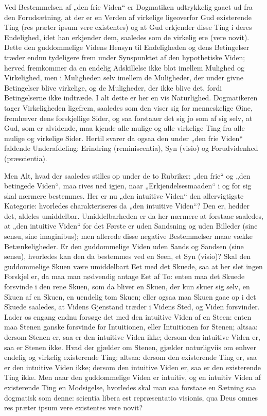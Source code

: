 \documentclass[12pt]{book}
\newcommand{\opage}[1]{\marginnote{\footnotesize\textit{[#1]}}}
\begin{document}
Ved Bestemmelsen af „den frie Viden“ er Dogmatiken udtrykkelig gaaet ud fra den Forudsætning, at
der er en Verden af virkelige ligeoverfor Gud existerende Ting (res præter ipsum vere existentes)
og at Gud erkjender disse Ting i deres Endelighed, idet han erkjender dem, saaledes som de virkelig
ere (vere novit). Dette den guddommelige Videns Hensyn til Endeligheden og dens Betingelser træder
endnu tydeligere frem under Synspunktet af den hypothetiske Viden; herved fremkommer da en endelig
Adskillelse ikke blot imellem Mulighed og Virkelighed, men i Muligheden selv imellem de Muligheder,
der under givne Betingelser blive virkelige, og de Muligheder, der ikke blive det, fordi
Betingelserne ikke indtræde. I alt dette er her en vis Naturlighed. Dogmatikeren tager
Virkeligheden ligefrem, saaledes som den viser sig for menneskelige Øine, fremhæver dens
forskjellige Sider, og saa forstaaer det sig jo som af sig selv, at Gud, som er alvidende, maa
kjende alle mulige og alle virkelige Ting fra alle mulige og virkelige Sider. Hertil svarer da
ogsaa den under „den frie Viden“ faldende Underafdeling: Erindring (reminiscentia), Syn (visio) og
Forudvidenhed (præscientia).

\opage{237} Men Alt, hvad der saaledes stilles op under de to Rubriker: „den frie“ og „den betingede Viden“,
maa rives ned igjen, naar „Erkjendelsesmaaden“ i og for sig skal nærmere bestemmes. Her er nu „den
intuitive Viden“ den allervigtigste Kategorie: hvorledes charakteriseres da „den intuitive Viden“?
Den er, hedder det, aldeles umiddelbar. Umiddelbarheden er da her nærmere at forstaae saaledes, at
„den intuitive Viden“ for det Første er uden Sandsning og uden Billeder (sine sensu, sine
imaginibus); men allerede disse negative Bestemmelser maae vække Betænkeligheder. Er den
guddommelige Viden uden Sands og Sandsen (sine sensu), hvorledes kan den da bestemmes ved en Seen,
et Syn (visio)? Skal den guddommelige Skuen være umiddelbart Eet med det Skuede, saa at her slet
ingen Forskjel er, da maa man nødvendig antage Eet af To: enten maa det Skuede forsvinde i den rene
Skuen, som da bliver en Skuen, der kun skuer sig selv, en Skuen af en Skuen, en uendelig tom Skuen;
eller ogsaa maa Skuen gaae op i det Skuede saaledes, at Videns Gjenstand træder i Videns Sted, og
Viden forsvinder. Lader os engang endnu forsøge det med den intuitive Viden af en Steen: enten maa
Stenen ganske forsvinde for Intuitionen, eller Intuitionen for Stenen; altsaa: dersom Stenen er,
saa er den intuitive Viden ikke; dersom den intuitive Viden er, saa er Stenen ikke. Hvad der
gjælder om Stenen, gjælder naturligviis om enhver endelig og virkelig existerende Ting; altsaa:
dersom den existerende Ting er, saa er den intuitive Viden ikke; dersom den intuitive Viden er, saa
er den existerende Ting ikke. Men naar den guddommelige Viden er intuitiv, og en intuitiv Viden af
existerende Ting en Modsigelse, hvorledes skal man saa forstaae en Sætning saa dogmatisk som denne:
scientia libera est repræsentatio visionis, qua Deus omnes res præter ipsum vere existentes vere
novit?
\end{document}
